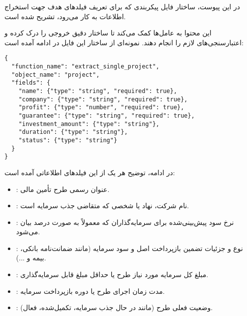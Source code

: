 
\label{appendix:config_format}

در این پیوست، ساختار فایل پیکربندی که برای تعریف فیلدهای هدف جهت استخراج اطلاعات به کار می‌رود، تشریح شده است.

این محتوا به عامل‌ها کمک می‌کند تا ساختار دقیق خروجی را درک کرده و اعتبارسنجی‌های لازم را انجام دهند. نمونه‌ای از ساختار این فایل در ادامه آمده است:

\begin{latin}
\begin{verbatim}
{
  "function_name": "extract_single_project",
  "object_name": "project",
  "fields": {
    "name": {"type": "string", "required": true},
    "company": {"type": "string", "required": true},
    "profit": {"type": "number", "required": true},
    "guarantee": {"type": "string", "required": true},
    "investment_amount": {"type": "string"},
    "duration": {"type": "string"},
    "status": {"type": "string"}
  }
}
\end{verbatim}
\end{latin}

\noindent
در ادامه، توضیح هر یک از این فیلدهای اطلاعاتی آمده است:
\begin{itemize}
    \item {}: عنوان رسمی طرح تأمین مالی.
    \item {}: نام شرکت، نهاد یا شخصی که متقاضی جذب سرمایه است.
    \item {}: نرخ سود پیش‌بینی‌شده برای سرمایه‌گذاران که معمولاً به صورت درصد بیان می‌شود.
    \item {}: نوع و جزئیات تضمین بازپرداخت اصل و سود سرمایه (مانند ضمانت‌نامه بانکی، بیمه و ...).
    \item {}: مبلغ کل سرمایه مورد نیاز طرح یا حداقل مبلغ قابل سرمایه‌گذاری.
    \item {}: مدت زمان اجرای طرح یا دوره بازپرداخت سرمایه.
    \item {}: وضعیت فعلی طرح (مانند در حال جذب سرمایه، تکمیل‌شده، فعال).
\end{itemize}


